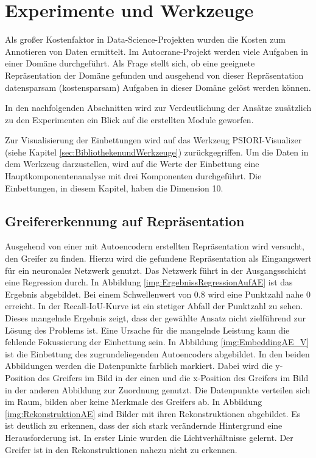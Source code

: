 \chapter{Experimente und Werkzeuge}
\label{chap:HauptteilMultiTaskLernen}
Als großer Kostenfaktor in Data-Science-Projekten wurden die Kosten zum Annotieren von Daten ermittelt. Im Autocrane-Projekt werden viele Aufgaben in einer Domäne durchgeführt. Als Frage stellt sich, ob eine geeignete Repräsentation der Domäne gefunden und ausgehend von dieser Repräsentation datensparsam (kostensparsam) Aufgaben in dieser Domäne gelöst werden können.  

In den nachfolgenden Abschnitten wird zur Verdeutlichung der Ansätze zusätzlich zu den Experimenten ein Blick auf die erstellten Module geworfen.

Zur Visualisierung der Einbettungen wird auf das Werkzeug PSIORI-Visualizer (siehe Kapitel \ref{sec:BibliothekenundWerkzeuge}) zurückgegriffen. Um die Daten in dem Werkzeug darzustellen, wird auf die Werte der Einbettung eine Hauptkomponentenanalyse mit drei Komponenten durchgeführt. Die Einbettungen, in diesem Kapitel, haben die Dimension 10.  

	\section{Greifererkennung auf Repräsentation}
	\label{sec:GreifererkennungAufAutoencoder}
	Ausgehend von einer mit Autoencodern erstellten Repräsentation wird versucht, den Greifer zu finden. Hierzu wird die gefundene Repräsentation als Eingangswert für ein neuronales Netzwerk genutzt. Das Netzwerk führt in der Ausgangsschicht eine Regression durch. In Abbildung \ref{img:ErgebnissRegressionAufAE} ist das Ergebnis abgebildet. Bei einem Schwellenwert von 0.8 wird eine Punktzahl nahe 0 erreicht. In der Recall-IoU-Kurve ist ein stetiger Abfall der Punktzahl zu sehen. Dieses mangelnde Ergebnis zeigt, dass der gewählte Ansatz nicht zielführend zur Lösung des Problems ist. Eine Ursache für die mangelnde Leistung kann die fehlende Fokussierung der Einbettung sein. In Abbildung \ref{img:EmbeddingAE_V} ist die Einbettung des zugrundeliegenden Autoencoders abgebildet. In den beiden Abbildungen werden die Datenpunkte farblich markiert. Dabei wird die y-Position des Greifers im Bild in der einen und die x-Position des Greifers im Bild in der anderen Abbildung zur Zuordnung genutzt. Die Datenpunkte verteilen sich im Raum, bilden aber keine Merkmale des Greifers ab. In Abbildung \ref{img:RekonstruktionAE} sind Bilder mit ihren Rekonstruktionen abgebildet. Es ist deutlich zu erkennen, dass der sich stark verändernde Hintergrund eine Herausforderung ist. In erster Linie wurden die Lichtverhältnisse gelernt. Der Greifer ist in den Rekonstruktionen nahezu nicht zu erkennen.

